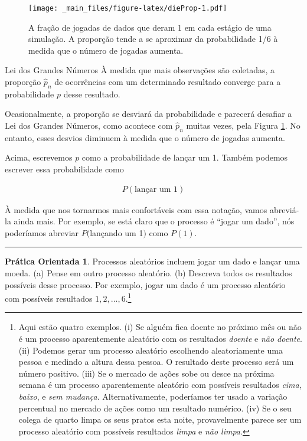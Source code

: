 \documentclass[
]{book}
\theoremstyle{definition}
\theoremstyle{definition}
\theoremstyle{definition}
\newtheorem{exercise}{Prática Orientada}[chapter]
\theoremstyle{definition}
\theoremstyle{remark}
\begin{document}
\begin{figure}
\centering
\texttt{[image: \_main\_files/figure-latex/dieProp-1.pdf]}
\caption{\label{fig:dieProp}A fração de jogadas de dados que deram 1 em cada estágio de uma simulação. A proporção tende a se aproximar da probabilidade 1/6 à medida que o número de jogadas aumenta.}
\end{figure}

Lei dos Grandes Números À medida que mais observações são coletadas, a proporção \(\hat{p}_n\) de ocorrências com um determinado resultado converge para a probabilidade \(p\) desse resultado.

Ocasionalmente, a proporção se desviará da probabilidade e parecerá desafiar a Lei dos Grandes Números, como acontece com \(\hat{p}_n\) muitas vezes, pela Figura \ref{fig:dieProp}. No entanto, esses desvios diminuem à medida que o número de jogadas aumenta.

Acima, escrevemos \(p\) como a probabilidade de lançar um 1. Também podemos escrever essa probabilidade como

\begin{eqnarray*}
P(\text{lançar um 1})
\end{eqnarray*}

À medida que nos tornarmos mais confortáveis com essa notação, vamos abreviá-la ainda mais. Por exemplo, se está claro que o processo é ``jogar um dado'', nós poderíamos abreviar \(P(\)lançando um 1\()\) como \(P(1)\).

\begin{center}\rule{0.5\linewidth}{0.5pt}\end{center}

\begin{exercise}
\protect\hypertarget{exr:randomProcessExercise}{}{\label{exr:randomProcessExercise} }
Processos aleatórios incluem jogar um dado e lançar uma moeda. (a) Pense em outro processo aleatório. (b) Descreva todos os resultados possíveis desse processo. Por exemplo, jogar um dado é um processo aleatório com possíveis resultados \(1, 2, \dots, 6\).\footnote{Aqui estão quatro exemplos. (i) Se alguém fica doente no próximo mês ou não é um processo aparentemente aleatório com os resultados \emph{doente} e \emph{não doente}. (ii) Podemos gerar um processo aleatório escolhendo aleatoriamente uma pessoa e medindo a altura dessa pessoa. O resultado deste processo será um número positivo. (iii) Se o mercado de ações sobe ou desce na próxima semana é um processo aparentemente aleatório com possíveis resultados \emph{cima}, \emph{baixo}, e \emph{sem mudança}. Alternativamente, poderíamos ter usado a variação percentual no mercado de ações como um resultado numérico. (iv) Se o seu colega de quarto limpa os seus pratos esta noite, provavelmente parece ser um processo aleatório com possíveis resultados \emph{limpa} e \emph{não limpa}.}
\end{exercise}
\end{document}
